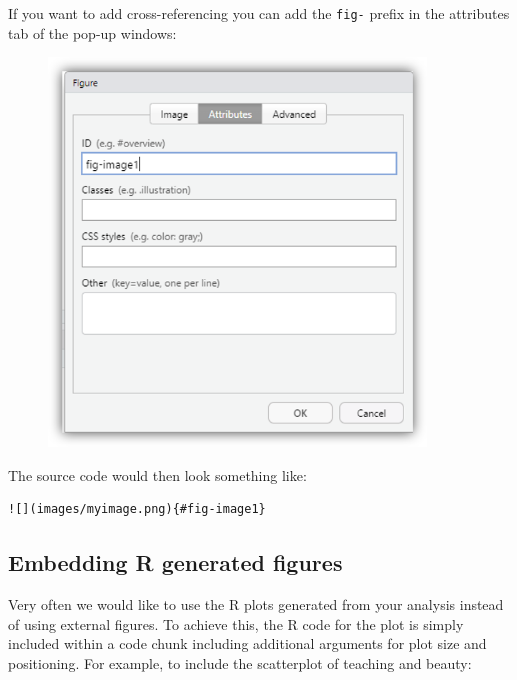 \documentclass[
  letterpaper,
  DIV=11,
  numbers=noendperiod]{scrartcl}
\begin{document}
If you want to add cross-referencing you can add the \texttt{fig-}
prefix in the attributes tab of the pop-up windows:

\begin{figure}

{\centering \includegraphics[width=3.94792in,height=\textheight]{images/quarto9.png}

}

\end{figure}

The source code would then look something like:

\begin{verbatim}
![](images/myimage.png){#fig-image1}
\end{verbatim}

\hypertarget{embedding-r-generated-figures}{%
\subsection{Embedding R generated
figures}\label{embedding-r-generated-figures}}

Very often we would like to use the R plots generated from your analysis
instead of using external figures. To achieve this, the R code for the
plot is simply included within a code chunk including additional
arguments for plot size and positioning. For example, to include the
scatterplot of teaching and beauty:
\end{document}
